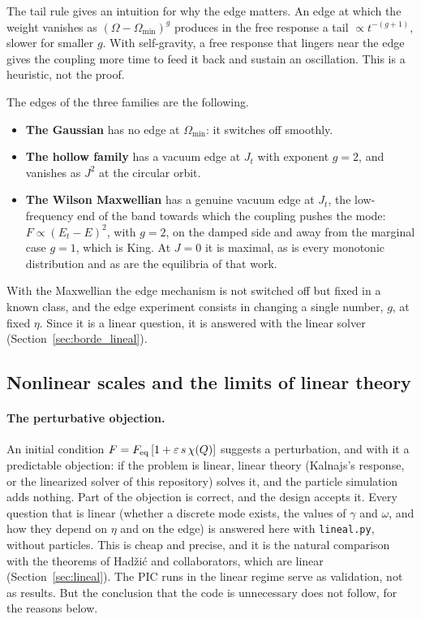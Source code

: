 \documentclass[11pt,a4paper]{article}
\begin{document}
The tail rule gives an intuition for why the edge matters. An edge at which the weight
vanishes as $(\Omega-\Omega_{\min})^g$ produces in the free response a tail $\propto t^{-(g+1)}$,
slower for smaller $g$. With self-gravity, a free response that lingers near the edge
gives the coupling more time to feed it back and sustain an oscillation. This is a
heuristic, not the proof.

The edges of the three families are the following.
\begin{itemize}
\item \textbf{The Gaussian} has no edge at $\Omega_{\min}$: it switches off smoothly.
\item \textbf{The hollow family} has a vacuum edge at $J_t$ with exponent $g=2$, and vanishes
as $J^2$ at the circular orbit.
\item \textbf{The Wilson Maxwellian} has a genuine vacuum edge at $J_t$, the low-frequency end
of the band towards which the coupling pushes the mode: $F\propto(E_t-E)^2$, with $g=2$, on
the damped side and away from the marginal case $g=1$, which is King. At $J=0$ it is
maximal, as is every monotonic distribution and as are the equilibria of that work.
\end{itemize}
With the Maxwellian the edge mechanism is not switched off but fixed in a known class,
and the edge experiment consists in changing a single number, $g$, at fixed $\eta$. Since
it is a linear question, it is answered with the linear solver
(Section~\ref{sec:borde_lineal}).

\subsection{Nonlinear scales and the limits of linear theory}
\label{sec:objecion}
\label{sec:atrapamiento}

\paragraph{The perturbative objection.} An initial condition $F=F_{\rm eq}\,[1+\varepsilon\,s\,\chi(Q)]$
suggests a perturbation, and with it a predictable objection: if the problem is linear,
linear theory (Kalnajs's response, or the linearized solver of this repository) solves
it, and the particle simulation adds nothing. Part of the objection is correct, and the
design accepts it. Every question that is linear (whether a discrete mode exists, the
values of $\gamma$ and $\omega$, and how they depend on $\eta$ and on the edge) is answered here
with \texttt{lineal.py}, without particles. This is cheap and precise, and it is the
natural comparison with the theorems of Hadžić and collaborators, which are linear
(Section~\ref{sec:lineal}). The PIC runs in the linear regime serve as validation, not as
results. But the conclusion that the code is unnecessary does not follow, for the
reasons below.
\end{document}

